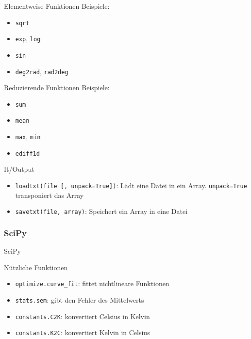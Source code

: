\begin{frame}{Elementweise Funktionen}
  Beispiele:
  \begin{itemize}
    \item \texttt{sqrt}
    \item \texttt{exp}, \texttt{log}
    \item \texttt{sin}
    \item \texttt{deg2rad}, \texttt{rad2deg}
  \end{itemize}
\end{frame}

\begin{frame}{Reduzierende Funktionen}
  Beispiele:
  \begin{itemize}
    \item \texttt{sum}
    \item \texttt{mean}
    \item \texttt{max}, \texttt{min}
    \item \texttt{ediff1d}
  \end{itemize}
\end{frame}

\begin{frame}{It/Output}
  \begin{itemize}
    \item \texttt{loadtxt(file [, unpack=True])}: Lädt eine Datei in ein Array.
      \texttt{unpack=True} transponiert das Array
    \item \texttt{savetxt(file, array)}: Speichert ein Array in eine Datei
  \end{itemize}
\end{frame}

\subsubsection{SciPy}
\begin{frame}{SciPy}
\end{frame}

\begin{frame}{Nützliche Funktionen}
  \begin{itemize}
    \item \texttt{optimize.curve\_fit}: fittet nichtlineare Funktionen
    \item \texttt{stats.sem}: gibt den Fehler des Mittelwerts
    \item \texttt{constants.C2K}: konvertiert Celsius in Kelvin
    \item \texttt{constants.K2C}: konvertiert Kelvin in Celsius
  \end{itemize}
\end{frame}

